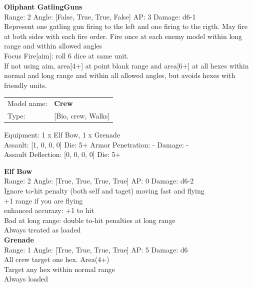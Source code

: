 {\bf Oliphant GatlingGuns } \\



Range: 2  Angle: [False, True, True, False] AP: 3 Damage: d6-1 \\
Represent one gatling gun firing to the left and one firing to the rigth. May fire at both sides with each fire order. Fire once at each enemy model within long range and within allowed angles\\ 
Focus Fire[aim]: roll 6 dice at same unit.\\ 
If not using aim, area[4+] at point blank range and area[6+] at all hexes within normal and long range and within all allowed angles, but avoids hexes with friendly units.\\ 




 



\begin{tabular}{ll}
Model name: & {\bf Crew } \\
Type: & [Bio, crew, Walks] \\
\end{tabular}

Equipment: 1 x Elf Bow, 1 x Grenade \\

Assault: [1, 0, 0, 0] Die: 5+ Armor Penetration: - Damage: - \\
Assault Deflection: [0, 0, 0, 0] Die: 5+\\
\indent  



{\bf Elf Bow } \\



Range: 2  Angle: [True, True, True, True] AP: 0 Damage: d6-2 \\
Ignore to-hit penalty (both self and taget) moving fast and flying\\ 
+1 range if you are flying\\ 
enhanced accurazy: +1 to hit\\ 
Bad at long range: double to-hit penalties at long range\\ 
Always treated as loaded\\ 




{\bf Grenade } \\



Range: 1  Angle: [True, True, True, True] AP: 5 Damage: d6 \\
All crew target one hex. Area(4+)\\ 
Target any hex within normal range\\ 
Always loaded\\ 




